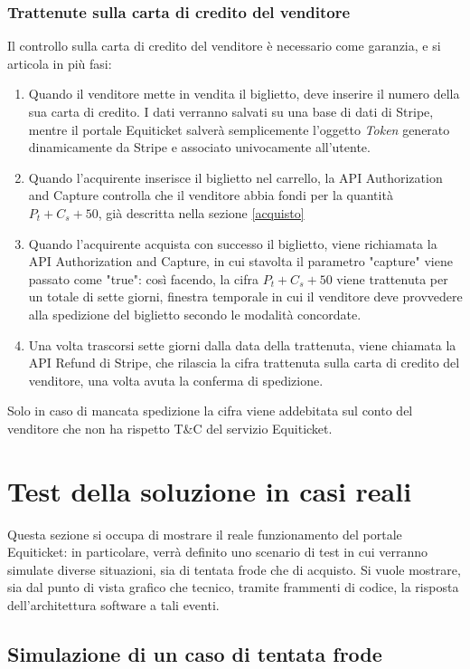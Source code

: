 \subsubsection{Trattenute sulla carta di credito del venditore}
Il controllo sulla carta di credito del venditore è necessario come garanzia, e si articola in più fasi: 
\begin{enumerate}
\item Quando il venditore mette in vendita il biglietto, deve inserire il numero della sua carta di credito. I dati verranno salvati su una base di dati di Stripe, mentre il portale Equiticket salverà semplicemente l'oggetto \textit{Token} generato dinamicamente da Stripe e associato univocamente all'utente.
\item Quando l'acquirente inserisce il biglietto nel carrello, la API Authorization and Capture controlla che il venditore abbia fondi per la quantità $P_{t} + C_{s} + 50$, già descritta nella sezione \ref{acquisto}
\item Quando l'acquirente acquista con successo il biglietto, viene richiamata la API Authorization and Capture, in cui stavolta il parametro "capture" viene passato come "true": così facendo, la cifra $P_{t} + C_{s} + 50$ viene trattenuta per un totale di sette giorni, finestra temporale in cui il venditore deve provvedere alla spedizione del biglietto secondo le modalità concordate.
\item Una volta trascorsi sette giorni dalla data della trattenuta, viene chiamata la API Refund di Stripe, che rilascia la cifra trattenuta sulla carta di credito del venditore, una volta avuta la conferma di spedizione.
\end{enumerate}
Solo in caso di mancata spedizione la cifra viene addebitata sul conto del venditore che non ha rispetto T\&C del servizio Equiticket. 
\section{Test della soluzione in casi reali}
Questa sezione si occupa di mostrare il reale funzionamento del portale Equiticket: in particolare, verrà definito uno scenario di test in cui verranno simulate diverse situazioni, sia di tentata frode che di acquisto. Si vuole mostrare, sia dal punto di vista grafico che tecnico, tramite frammenti di codice, la risposta dell'architettura software a tali eventi. 
\subsection{Simulazione di un caso di tentata frode}
